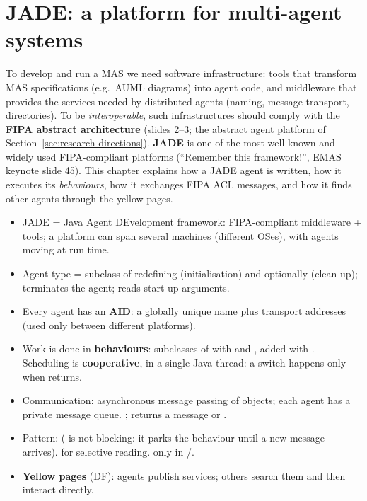 \section{JADE: a platform for multi-agent systems}
\label{sec:jade}

To develop and run a MAS we need software infrastructure: tools that transform MAS
specifications (e.g.\ AUML diagrams) into agent code, and middleware that provides the
services needed by distributed agents (naming, message transport, directories). To be
\emph{interoperable}, such infrastructures should comply with the \textbf{FIPA abstract
architecture} (slides 2--3; the abstract agent platform of Section~\ref{sec:research-directions}).
\textbf{JADE} is one of the most well-known and widely used FIPA-compliant platforms
(``Remember this framework!'', EMAS keynote slide 45). This chapter explains how a JADE agent
is written, how it executes its \emph{behaviours}, how it exchanges FIPA ACL messages, and
how it finds other agents through the yellow pages.





\begin{nbsummary}[JADE]
\begin{itemize}[nosep]
  \item JADE = Java Agent DEvelopment framework: FIPA-compliant middleware + tools; a
        platform can span several machines (different OSes), with agents moving at run time.
  \item Agent type = subclass of  redefining 
        (initialisation) and optionally  (clean-up); 
        terminates the agent;  reads start-up arguments.
  \item Every agent has an \textbf{AID}: a globally unique name
         plus transport addresses (used only between
        different platforms).
  \item Work is done in \textbf{behaviours}: subclasses of
         with  and , added
        with . Scheduling is \textbf{cooperative}, in a single Java
        thread: a switch happens only when  returns.
  \item Communication: asynchronous message passing of  objects; each agent
        has a private message queue. ;  returns a message or
        .
  \item Pattern: 
        ( is not blocking: it parks the behaviour until a new message
        arrives).  for selective reading.
         only in /.
  \item \textbf{Yellow pages} (DF): agents publish services; others search them and then
        interact directly.
\end{itemize}
\end{nbsummary}
